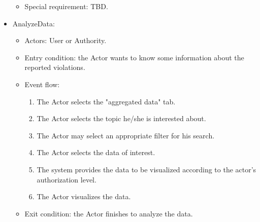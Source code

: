 \begin{itemize}
\begin{itemize}
            \item Special requirement: TBD.
        \end{itemize}
        \item AnalyzeData:
        \begin{itemize}
            \item Actors: User or Authority.
            \item Entry condition: the Actor wants to know some information about the reported violations.
            \item Event flow:
            \begin{enumerate}
                \item The Actor selects the "aggregated data" tab.
                \item The Actor selects the topic he/she is interested about.
                \item The Actor may select an appropriate filter for his search.
                \item The Actor selects the data of interest.
                \item The system provides the data to be visualized according to the actor's authorization level.
                \item The Actor visualizes the data.
            \end{enumerate}
            \item Exit condition: the Actor finishes to analyze the data.
        \end{itemize}
    \end{itemize}